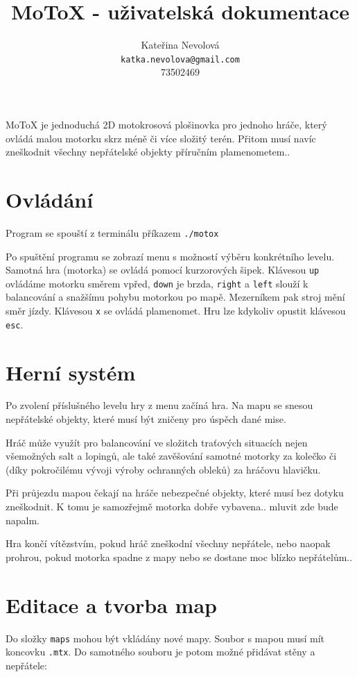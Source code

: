 \documentclass{article}
\title{MoToX - uživatelská dokumentace}
\author{Kateřina Nevolová \\ \texttt{katka.nevolova@gmail.com} \\ 73502469}
\begin{document}
\maketitle

MoToX je jednoduchá 2D motokrosová plošinovka pro jednoho hráče, který ovládá malou motorku skrz méně či více složitý terén. Přitom musí navíc zneškodnit všechny nepřátelské objekty příručním plamenometem..

\section{Ovládání}

Program se spouští z terminálu příkazem \texttt{./motox}

Po spuštění programu se zobrazí menu s možností výběru konkrétního levelu. Samotná hra (motorka) se ovládá pomocí kurzorových šipek. Klávesou \texttt{up} ovládáme motorku směrem vpřed, \texttt{down} je brzda, \texttt{right} a \texttt{left} slouží k balancování a snažšímu pohybu motorkou po mapě. Mezerníkem pak stroj mění směr jízdy. Klávesou \texttt{x} se ovládá plamenomet. Hru lze kdykoliv opustit klávesou \texttt{esc}.

\section{Herní systém}

Po zvolení příslušného levelu hry z menu začíná hra. Na mapu se snesou nepřátelské objekty, které musí být zničeny pro úspěch dané mise.

Hráč může využít pro balancování ve složitch traťových situacích nejen všemožných salt a lopingů, ale také zavěšování samotné motorky za kolečko či (díky pokročilému vývoji výroby ochranných obleků) za hráčovu hlavičku.

Při průjezdu mapou čekají na hráče nebezpečné objekty, které musí bez dotyku zneškodnit. K tomu je samozřejmě motorka dobře vybavena.. mluvit zde bude napalm.

Hra končí vítězstvím, pokud hráč zneškodní všechny nepřátele, nebo naopak prohrou, pokud motorka spadne z mapy nebo se dostane moc blízko nepřátelům..

\section{Editace a tvorba map}
Do složky \texttt{maps} mohou být vkládány nové mapy. Soubor s mapou musí mít koncovku \texttt{.mtx}. Do samotného souboru je potom možné přidávat stěny a nepřátele:
\end{document}

